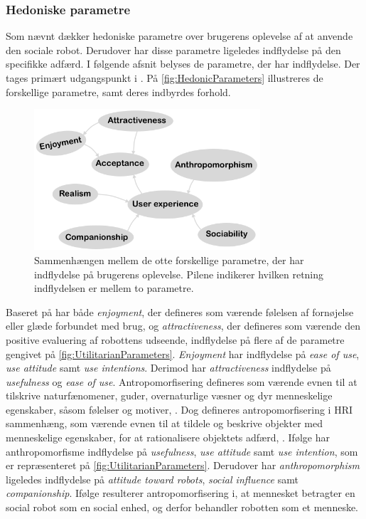 \subsubsection*{Hedoniske parametre}
\label{InteraktionSocialeRobotterParametreHedonic}
%
Som nævnt dækker hedoniske parametre over brugerens oplevelse af at anvende den sociale robot. Derudover har disse parametre ligeledes indflydelse på den specifikke adfærd. I følgende afsnit belyses de parametre, der har indflydelse. Der tages primært udgangspunkt i \textcite[ss. 1477-1478]{PDF:SharingALifeHarvey}. På \autoref{fig:HedonicParameters} illustreres de forskellige parametre, samt deres indbyrdes forhold.
%
\begin{figure}[H]
\centering
\includegraphics[width = 0.75\textwidth]{Figure/HedonicParameters} 
\caption{Sammenhængen mellem de otte forskellige parametre, der har indflydelse på brugerens oplevelse. Pilene indikerer hvilken retning indflydelsen er mellem to parametre.}
\label{fig:HedonicParameters}
\end{figure}
\noindent 
%
Baseret på \textcite[s. 1477]{PDF:ExploringInfluencingVariable} har både \textit{enjoyment}, der defineres som værende følelsen af fornøjelse eller glæde forbundet med brug, og \textit{attractiveness}, der defineres som værende den positive evaluering af robottens udseende, indflydelse på flere af de parametre gengivet på \autoref{fig:UtilitarianParameters}. \textit{Enjoyment} har indflydelse på \textit{ease of use}, \textit{use attitude} samt \textit{use intentions}. Derimod har \textit{attractiveness} indflydelse på \textit{usefulness} og \textit{ease of use}. \blankline 
%
Antropomorfisering defineres som værende evnen til at tilskrive naturfænomener, guder, overnaturlige væsner og dyr menneskelige egenskaber, såsom følelser og motiver, \parencite{WEB:DefAntropomorisering}. Dog defineres antropomorfisering i HRI sammenhæng, som værende evnen til at tildele og beskrive objekter med menneskelige egenskaber, for at rationalisere objektets adfærd, \parencite[s. 1478]{PDF:ExploringInfluencingVariable}. Ifølge \textcite[s. 1478]{PDF:ExploringInfluencingVariable} har anthropomorfisme indflydelse på \textit{usefulness}, \textit{use attitude} samt \textit{use intention}, som er repræsenteret på \autoref{fig:UtilitarianParameters}. Derudover har \textit{anthropomorphism} ligeledes indflydelse på \textit{attitude toward robots}, \textit{social influence} samt \textit{companionship}. Ifølge \textcite[s. 19]{PDF:CloseButNotStuck} resulterer antropomorfisering i, at mennesket betragter en social robot som en social enhed, og derfor behandler robotten som et menneske.

